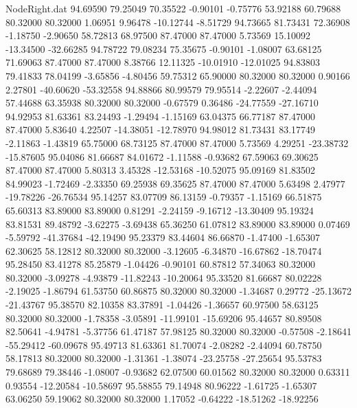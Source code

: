 \begin{filecontents}{NodeRight.dat}
  94.69590   79.25049   70.35522    -0.90101   -0.75776   53.92188   60.79688   80.32000   80.32000    1.06951    9.96478  -10.12744   -8.51729
  94.73665   81.73431   72.36908    -1.18750   -2.90650   58.72813   68.97500   87.47000   87.47000    5.73569   15.10092  -13.34500  -32.66285
  94.78722   79.08234   75.35675    -0.90101   -1.08007   63.68125   71.69063   87.47000   87.47000    8.38766   12.11325  -10.01910  -12.01025
  94.83803   79.41833   78.04199    -3.65856   -4.80456   59.75312   65.90000   80.32000   80.32000    0.90166    2.27801  -40.60620  -53.32558
  94.88866   80.99579   79.95514    -2.22607   -2.44094   57.44688   63.35938   80.32000   80.32000   -0.67579    0.36486  -24.77559  -27.16710
  94.92953   81.63361   83.24493    -1.29494   -1.15169   63.04375   66.77187   87.47000   87.47000    5.83640    4.22507  -14.38051  -12.78970
  94.98012   81.73431   83.17749    -2.11863   -1.43819   65.75000   68.73125   87.47000   87.47000    5.73569    4.29251  -23.38732  -15.87605
  95.04086   81.66687   84.01672    -1.11588   -0.93682   67.59063   69.30625   87.47000   87.47000    5.80313    3.45328  -12.53168  -10.52075
  95.09169   81.83502   84.99023    -1.72469   -2.33350   69.25938   69.35625   87.47000   87.47000    5.63498    2.47977  -19.78226  -26.76534
  95.14257   83.07709   86.13159    -0.79357   -1.15169   66.51875   65.60313   83.89000   83.89000    0.81291   -2.24159   -9.16712  -13.30409
  95.19324   83.81531   89.48792    -3.62275   -3.69438   65.36250   61.07812   83.89000   83.89000    0.07469   -5.59792  -41.37684  -42.19490
  95.23379   83.44604   86.66870    -1.47400   -1.65307   62.30625   58.12812   80.32000   80.32000   -3.12605   -6.34870  -16.67862  -18.70474
  95.28450   83.41278   85.25879    -1.04426   -0.90101   60.87812   57.34063   80.32000   80.32000   -3.09278   -4.93879  -11.82243  -10.20064
  95.33520   81.66687   80.02228    -2.19025   -1.86794   61.53750   60.86875   80.32000   80.32000   -1.34687    0.29772  -25.13672  -21.43767
  95.38570   82.10358   83.37891    -1.04426   -1.36657   60.97500   58.63125   80.32000   80.32000   -1.78358   -3.05891  -11.99101  -15.69206
  95.44657   80.89508   82.50641    -4.94781   -5.37756   61.47187   57.98125   80.32000   80.32000   -0.57508   -2.18641  -55.29412  -60.09678
  95.49713   81.63361   81.70074    -2.08282   -2.44094   60.78750   58.17813   80.32000   80.32000   -1.31361   -1.38074  -23.25758  -27.25654
  95.53783   79.68689   79.38446    -1.08007   -0.93682   62.07500   60.01562   80.32000   80.32000    0.63311    0.93554  -12.20584  -10.58697
  95.58855   79.14948   80.96222    -1.61725   -1.65307   63.06250   59.19062   80.32000   80.32000    1.17052   -0.64222  -18.51262  -18.92256

\end{filecontents}

